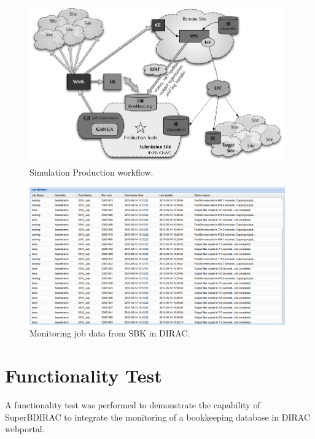 \documentclass[a4paper]{jpconf}
\begin{document}
\begin{figure}[h]
\includegraphics[width=26pc]{img/simulation_production_system_workflow.eps}\hspace{2pc}%
\caption{\label{fig:simulation_production_workflow}Simulation Production workflow.}
\end{figure}
 
\begin{figure}[h]
\includegraphics[width=26pc]{img/SuperBDIRAC_monitoring.eps}\hspace{2pc}%
\caption{\label{fig:superbdirac_monitoring}Monitoring job data from SBK in DIRAC.}
\end{figure}

\section{Functionality Test}
\label{sec:test}
A functionality test was performed to demonstrate the capability of SuperBDIRAC to integrate the monitoring of a bookkeeping database in DIRAC webportal.
\end{document}

